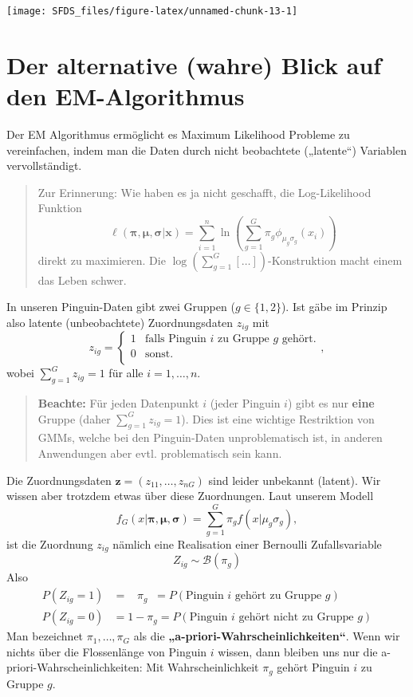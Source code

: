 \documentclass[
  ngerman,
]{book}
\begin{document}
\begin{center}\texttt{[image: SFDS\_files/figure-latex/unnamed-chunk-13-1]} \end{center}

\hypertarget{der-alternative-wahre-blick-auf-den-em-algorithmus}{%
\section{Der alternative (wahre) Blick auf den EM-Algorithmus}\label{der-alternative-wahre-blick-auf-den-em-algorithmus}}

Der EM Algorithmus ermöglicht es Maximum Likelihood Probleme zu vereinfachen, indem man die Daten durch nicht beobachtete („latente``) Variablen vervollständigt.

\begin{quote}
Zur Erinnerung: Wie haben es ja nicht geschafft, die Log-Likelihood Funktion
\[
\ell(\boldsymbol{\pi},\boldsymbol{\mu},\boldsymbol{\sigma}|\mathbf{x})
=\sum_{i=1}^n\ln\left(\sum_{g=1}^G\pi_g\phi_{\mu_g\sigma_g}(x_i)\right)
\]
direkt zu maximieren. Die \(\log(\sum_{g=1}^G[\dots])\)-Konstruktion macht einem das Leben schwer.
\end{quote}

In unseren Pinguin-Daten gibt zwei Gruppen (\(g\in\{1,2\}\)). Ist gäbe im Prinzip also latente (unbeobachtete) Zuordnungsdaten \(z_{ig}\) mit
\[
z_{ig}=
\left\{\begin{array}{ll}
1&\text{falls Pinguin }i\text{ zu Gruppe }g\text{ gehört.}\\
0&\text{sonst.}\\
\end{array}\right.,
\]
wobei \(\sum_{g=1}^Gz_{ig}=1\) für alle \(i=1,\dots,n\).

\begin{quote}
\textbf{Beachte:} Für jeden Datenpunkt \(i\) (jeder Pinguin \(i\)) gibt es nur \textbf{eine} Gruppe (daher \(\sum_{g=1}^Gz_{ig}=1\)). Dies ist eine wichtige Restriktion von GMMs, welche bei den Pinguin-Daten unproblematisch ist, in anderen Anwendungen aber evtl. problematisch sein kann.
\end{quote}

Die Zuordnungsdaten \(\mathbf{z}=(z_{11},\dots,z_{nG})\) sind leider unbekannt (latent). Wir wissen aber trotzdem etwas über diese Zuordnungen. Laut unserem Modell
\[
f_G(x|\boldsymbol{\pi},\boldsymbol{\mu},\boldsymbol{\sigma})=\sum_{g=1}^G\pi_gf(x|\mu_g\sigma_g),
\]
ist die Zuordnung \(z_{ig}\) nämlich eine Realisation einer Bernoulli Zufallsvariable
\[
Z_{ig}\sim\mathcal{B}(\pi_g)
\]
Also
\begin{align*}
P(Z_{ig}=1)&=\;\;\;\pi_g\;\;=P(\text{Pinguin $i$ gehört zu Gruppe }g)\\
P(Z_{ig}=0)&=1-\pi_g=P(\text{Pinguin $i$ gehört nicht zu Gruppe }g)
\end{align*}
Man bezeichnet \(\pi_1,\dots,\pi_G\) als die \textbf{„a-priori-Wahrscheinlichkeiten``}. Wenn wir nichts über die Flossenlänge von Pinguin \(i\) wissen, dann bleiben uns nur die a-priori-Wahrscheinlichkeiten: Mit Wahrscheinlichkeit \(\pi_g\) gehört Pinguin \(i\) zu Gruppe \(g\).
\end{document}
